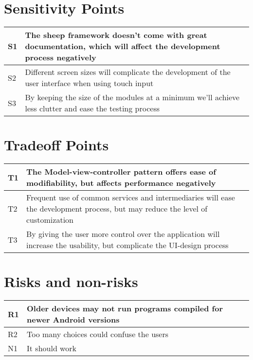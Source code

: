 \section{Sensitivity Points}

\begin{tabular}{|m{}|m{}|}
  \hline
  S1 & The sheep framework doesn't come with great documentation, which will
  affect the development process negatively \\ \hline
  S2 & Different screen sizes will complicate the development of the user
  interface when using touch input \\ \hline
  S3 & By keeping the size of the modules at a minimum we'll achieve less
  clutter and ease the testing process \\ \hline 
\end{tabular}

\section{Tradeoff Points}
\begin{tabular}{|m{}|m{}|}
  \hline
  T1 & The Model-view-controller pattern offers ease of modifiability, but
  affects performance negatively \\ \hline
  T2 & Frequent use of common services and intermediaries will ease the
  development process, but may reduce the
  level of customization \\ \hline
  T3 & By giving the user more control over the application will increase the
  usability, but complicate the UI-design process \\ \hline
\end{tabular}

\section{Risks and non-risks}
\begin{tabular}{|m{}|m{}|}
  \hline
  R1 & Older devices may not run programs compiled for newer Android
  versions \\ \hline
  R2 & Too many choices could confuse the users \\ \hline
  N1 & It should work \\ \hline
\end{tabular}

